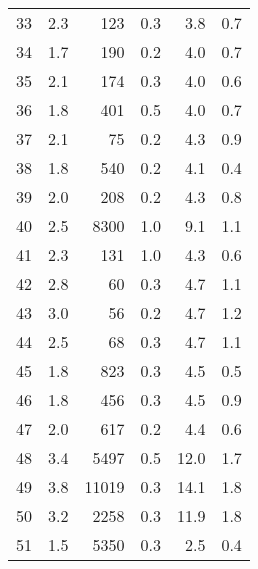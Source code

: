 \begin{tabular}{|r|r|r|r|r|r|}
33 &  2.3 & 123 & 0.3 & 3.8 & 0.7\\
34 &  1.7 & 190 & 0.2 & 4.0 & 0.7\\
35 &  2.1 & 174 & 0.3 & 4.0 & 0.6\\
36 &  1.8 & 401 & 0.5 & 4.0 & 0.7\\
37 &  2.1 & 75 & 0.2 & 4.3 & 0.9\\
38 &  1.8 & 540 & 0.2 & 4.1 & 0.4\\
39 &  2.0 & 208 & 0.2 & 4.3 & 0.8\\
40 &  2.5 & 8300 & 1.0 & 9.1 & 1.1\\
41 &  2.3 & 131 & 1.0 & 4.3 & 0.6\\
42 &  2.8 & 60 & 0.3 & 4.7 & 1.1\\
43 &  3.0 & 56 & 0.2 & 4.7 & 1.2\\
44 &  2.5 & 68 & 0.3 & 4.7 & 1.1\\
45 &  1.8 & 823 & 0.3 & 4.5 & 0.5\\
46 &  1.8 & 456 & 0.3 & 4.5 & 0.9\\
47 &  2.0 & 617 & 0.2 & 4.4 & 0.6\\
48 &  3.4 & 5497 & 0.5 & 12.0 & 1.7\\
49 &  3.8 & 11019 & 0.3 & 14.1 & 1.8\\
50 &  3.2 & 2258 & 0.3 & 11.9 & 1.8\\
51 &  1.5 & 5350 & 0.3 & 2.5 & 0.4\\
\hline
\end{tabular}
